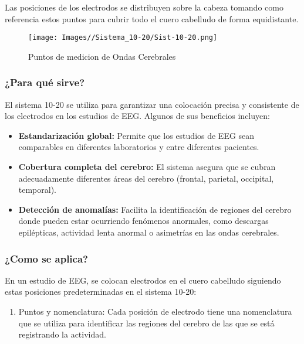 \documentclass{article}
\begin{document}
Las posiciones de los electrodos se distribuyen sobre la cabeza tomando como referencia estos puntos para cubrir todo el cuero cabelludo de forma equidistante.

\begin{figure}
    \centering
    \texttt{[image: Images//Sistema\_10-20/Sist-10-20.png]}
    \caption{Puntos de medicion de Ondas Cerebrales}
    \label{fig:enter-label}
\end{figure}

\subsubsection{¿Para qué sirve?}
El sistema 10-20 se utiliza para garantizar una colocación precisa y consistente de los electrodos en los estudios de EEG. Algunos de sus beneficios incluyen:

\begin{itemize}

    \item \textbf{Estandarización global:} Permite que los estudios de EEG sean comparables en diferentes laboratorios y entre diferentes pacientes.
    \item \textbf{Cobertura completa del cerebro:} El sistema asegura que se cubran adecuadamente diferentes áreas del cerebro (frontal, parietal, occipital, temporal).
    \item \textbf{Detección de anomalías:} Facilita la identificación de regiones del cerebro donde pueden estar ocurriendo fenómenos anormales, como descargas epilépticas, actividad lenta anormal o asimetrías en las ondas cerebrales.
    
\end{itemize}

\subsubsection{¿Como se aplica?}

En un estudio de EEG, se colocan electrodos en el cuero cabelludo siguiendo estas posiciones predeterminadas en el sistema 10-20:

\begin{enumerate}
    \item Puntos y nomenclatura: Cada posición de electrodo tiene una nomenclatura que se utiliza para identificar las regiones del cerebro de las que se está registrando la actividad.
\end{enumerate}
\end{document}
